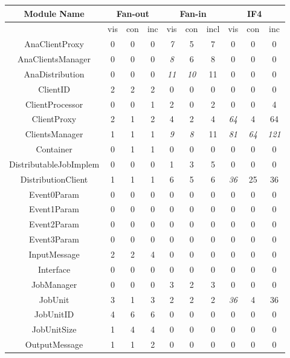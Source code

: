 \begin{tabular}{|c|c|c|c|c|c|c|c|c|c|}
        \hline
        Module Name & \multicolumn{3}{|c|}{Fan-out} & \multicolumn{3}{|c|}{Fan-in} & \multicolumn{3}{|c|}{IF4} \\
        \hline 
 &vis &con &inc &vis &con &incl &vis &con &inc \\
 \hline 
 AnaClientProxy & 0 & 0 & 0 &\emph{ 7}
 & 5 & 7 & 0 & 0 & 0 \\
 \hline 
 AnaClientsManager & 0 & 0 & 0 &\emph{ 8}
 & 6 & 8 & 0 & 0 & 0 \\
 \hline 
 AnaDistribution & 0 & 0 & 0 &\emph{ 11}
 &\emph{ 10}
 & 11 & 0 & 0 & 0 \\
 \hline 
 ClientID & 2 & 2 & 2 & 0 & 0 & 0 & 0 & 0 & 0 \\
 \hline 
 ClientProcessor & 0 & 0 & 1 & 2 & 0 & 2 & 0 & 0 & 4 \\
 \hline 
 ClientProxy & 2 & 1 & 2 & 4 & 2 & 4 &\emph{ 64}
 & 4 & 64 \\
 \hline 
 ClientsManager & 1 & 1 & 1 &\emph{ 9}
 &\emph{ 8}
 & 11 &\emph{ 81}
 &\emph{ 64}
 &\emph{ 121}
 \\
 \hline 
 Container & 0 & 1 & 1 & 0 & 0 & 0 & 0 & 0 & 0 \\
 \hline 
 DistributableJobImplem & 0 & 0 & 0 & 1 & 3 & 5 & 0 & 0 & 0 \\
 \hline 
 DistributionClient & 1 & 1 & 1 & 6 & 5 & 6 &\emph{ 36}
 & 25 & 36 \\
 \hline 
 Event0Param & 0 & 0 & 0 & 0 & 0 & 0 & 0 & 0 & 0 \\
 \hline 
 Event1Param & 0 & 0 & 0 & 0 & 0 & 0 & 0 & 0 & 0 \\
 \hline 
 Event2Param & 0 & 0 & 0 & 0 & 0 & 0 & 0 & 0 & 0 \\
 \hline 
 Event3Param & 0 & 0 & 0 & 0 & 0 & 0 & 0 & 0 & 0 \\
 \hline 
 InputMessage & 2 & 2 & 4 & 0 & 0 & 0 & 0 & 0 & 0 \\
 \hline 
 Interface & 0 & 0 & 0 & 0 & 0 & 0 & 0 & 0 & 0 \\
 \hline 
 JobManager & 0 & 0 & 0 & 3 & 2 & 3 & 0 & 0 & 0 \\
 \hline 
 JobUnit & 3 & 1 & 3 & 2 & 2 & 2 &\emph{ 36}
 & 4 & 36 \\
 \hline 
 JobUnitID & 4 & 6 & 6 & 0 & 0 & 0 & 0 & 0 & 0 \\
 \hline 
 JobUnitSize & 1 & 4 & 4 & 0 & 0 & 0 & 0 & 0 & 0 \\
 \hline 
 OutputMessage & 1 & 1 & 2 & 0 & 0 & 0 & 0 & 0 & 0 \\

\end{tabular}
